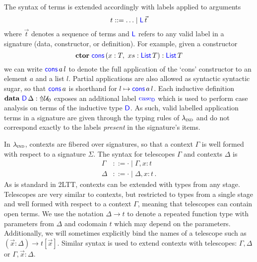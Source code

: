 The syntax of terms is extended accordingly with labels applied to arguments
\[
  t ::= \ldots \mid {\ensuremath{\color{blue}{\mathsf{L}}}} \, \vec{t}
\]
where $\vec{t}$ denotes a sequence of terms and ${\color{blue}{\mathsf{L}}}$ refers to any valid
label in a signature (data, constructor, or definition). For example, given a
constructor
\[
  \textbf{ctor} \ {\color{blue}{\mathsf{cons}}} \, {(x : T,\ xs : {\color{blue}{\mathsf{List}}}\, T)} : {\color{blue}{\mathsf{{\ensuremath{\color{blue}{\mathsf{List}}}}}}}\, {T}
\]
we can write ${\color{blue}{\mathsf{cons}}} \, a \, l$ to denote the full application of the
`cons' constructor to an element $a$ and a list $l$. Partial applications are
also allowed as syntactic syntactic sugar, so that ${\color{blue}{\mathsf{cons}}} \, a$ is
shorthand for $l \mapsto {\ensuremath{\color{blue}{\mathsf{cons}}}}\,a\,l$. Each inductive definition
$\textbf{data} \ {\color{blue}{\mathsf{D}}} \, {\Delta} : \text{$\Uparrow$}{\mathcal{U}_0}$ exposes an additional label ${\color{blue}{\mathsf{\textrm{case}_{D}}}}$ which is used to
perform case analysis on terms of the inductive type ${\color{blue}{\mathsf{D}}}$. As such, valid
labelled application terms in a signature are given through the typing rules of
$\lambda_{\textsc{ind}}$ and do not correspond exactly to the labels \emph{present} in the
signature's items.

In $\lambda_{\textsc{ind}}$, contexts are fibered over signatures, so that a context
$\Gamma$ is well formed with respect to a signature $\Sigma$. The syntax for
telescopes $\Gamma$ and contexts $\Delta$ is
\begin{align*}
  \Gamma & ::= \cdot \mid \Gamma, x : t      \\
  \Delta & ::= \cdot \mid \Delta, x : t  \,.
\end{align*}
As is standard in 2LTT, contexts can be extended with types from any stage.
Telescopes are very similar to contexts, but restricted to types from a single stage and
well formed with respect to a context $\Gamma$, meaning that telescopes can
contain open terms. We use the notation $\Delta \to t$ to denote a repeated
function type with parameters from $\Delta$ and codomain $t$ which may depend
on the parameters. Additionally, we will sometimes explicitly bind the names of
a telescope such as $(\vec{x} : \Delta) \to t[\vec{x}]$. Similar syntax is used
to extend contexts with telescopes: $\Gamma, \Delta$ or $\Gamma, \vec{x} :
  \Delta$.

